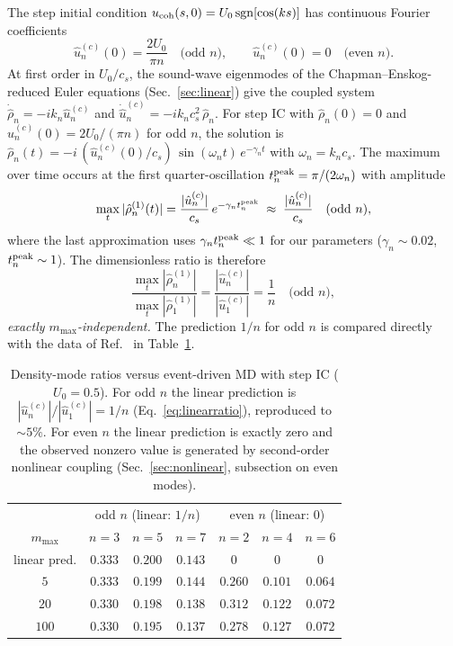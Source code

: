 \documentclass[aps,pre,twocolumn,superscriptaddress,longbibliography,floatfix]{revtex4-2}
\begin{document}
The step initial condition
$u_{\rm coh}(s,0)=U_0\,\mathrm{sgn}[\cos(ks)]$ has continuous
Fourier coefficients
\begin{equation}
\hat u^{(c)}_n(0) = \frac{2U_0}{\pi n}\quad\text{(odd $n$)},
\qquad \hat u^{(c)}_n(0) = 0 \quad\text{(even $n$)}.
\label{eq:uic}
\end{equation}
At first order in $U_0/c_s$, the sound-wave eigenmodes of the
Chapman--Enskog-reduced Euler equations
(Sec.~\ref{sec:linear}) give the coupled system
$\dot{\hat\rho}_n = -ik_n \hat u_n^{(c)}$ and
$\dot{\hat u}_n^{(c)} = -ik_n c_s^2\,\hat\rho_n$. For step IC
with $\hat\rho_n(0)=0$ and $\hat u_n^{(c)}(0)=2U_0/(\pi n)$
for odd $n$, the solution is
$\hat\rho_n(t) = -i\,(\hat u^{(c)}_n(0)/c_s)\,\sin(\omega_n t)\,
e^{-\gamma_n t}$ with $\omega_n = k_n c_s$. The maximum
over time occurs at the first quarter-oscillation
$t_n^{\rm peak} = \pi/(2\omega_n)$ with amplitude
\begin{equation}
\max_t |\hat\rho_n^{(1)}(t)|
= \frac{|\hat u^{(c)}_n|}{c_s}\,e^{-\gamma_n t_n^{\rm peak}}
\;\approx\; \frac{|\hat u^{(c)}_n|}{c_s}
\quad\text{(odd $n$)},
\label{eq:rhomax}
\end{equation}
where the last approximation uses
$\gamma_n t_n^{\rm peak}\ll 1$ for our parameters
($\gamma_n\sim 0.02$, $t_n^{\rm peak}\sim 1$).
The dimensionless ratio is therefore
\begin{equation}
\frac{\max_t|\hat\rho_n^{(1)}|}{\max_t|\hat\rho_1^{(1)}|}
= \frac{|\hat u^{(c)}_n|}{|\hat u^{(c)}_1|} = \frac{1}{n}
\quad\text{(odd $n$)},
\label{eq:linearratio}
\end{equation}
\emph{exactly $m_{\max}$-independent.} The prediction $1/n$ for
odd $n$ is compared directly with the data of
Ref.~\cite{PaperIII} in Table~\ref{tab:nonlin}.

\begin{table}[t]
\centering
\caption{Density-mode ratios versus event-driven MD with step
IC ($U_0=0.5$). For odd $n$ the linear prediction is
$|\hat u^{(c)}_n|/|\hat u^{(c)}_1|=1/n$
(Eq.~\ref{eq:linearratio}), reproduced to $\sim 5\%$. For even
$n$ the linear prediction is exactly zero and the observed
nonzero value is generated by second-order nonlinear coupling
(Sec.~\ref{sec:nonlinear}, subsection on even modes).}
\label{tab:nonlin}
\begin{tabular}{ccccccc}
\hline\hline
& \multicolumn{3}{c}{odd $n$ (linear: $1/n$)}
& \multicolumn{3}{c}{even $n$ (linear: $0$)}\\
$m_{\max}$ & $n{=}3$ & $n{=}5$ & $n{=}7$
           & $n{=}2$ & $n{=}4$ & $n{=}6$ \\
\hline
linear pred. & $0.333$ & $0.200$ & $0.143$
             & $0$     & $0$     & $0$\\
$5$    & $0.333$ & $0.199$ & $0.144$ & $0.260$ & $0.101$ & $0.064$\\
$20$   & $0.330$ & $0.198$ & $0.138$ & $0.312$ & $0.122$ & $0.072$\\
$100$  & $0.330$ & $0.195$ & $0.137$ & $0.278$ & $0.127$ & $0.072$\\
\hline\hline
\end{tabular}
\end{table}
\end{document}
